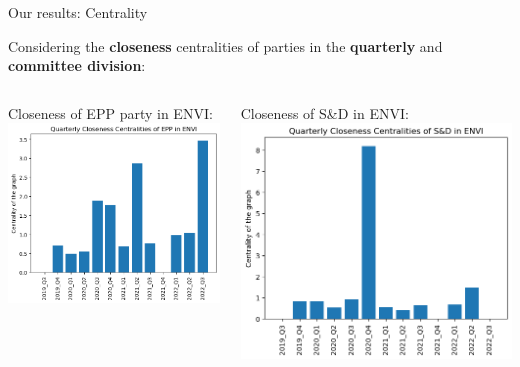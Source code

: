 \documentclass{beamer}
\begin{document}
\begin{frame}{Our results: Centrality}
	
	Considering the \textbf{closeness} centralities of parties in the \textbf{quarterly} and \textbf{committee division}:
	\vspace{4mm}
	\pause
	
\begin{columns}
	\begin{column}{0.5\textwidth}
	Closeness of EPP party in ENVI:
	\\
	\includegraphics[width=\textwidth]{img/EPP_ENVI_Q_closeness.png}
	\end{column}
	
	\pause 
	\begin{column}{0.5\textwidth}
	Closeness of S\&D in ENVI:
	\includegraphics[width=\textwidth]{img/S&D_ENVI_Q_closeness.png}
	\end{column}
	
\end{columns}
\end{frame}
\end{document}
